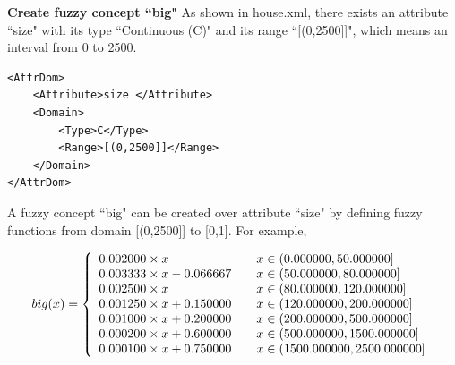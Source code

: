 \begin{ex} \textbf{Create fuzzy concept ``big"}
\label{ex:CreateFuzzyConcept}
As shown in house.xml, there exists an attribute ``size"  with its type ``Continuous (C)" and its range ``[(0,2500]]", which means an interval from 0 to 2500.
\begin{lstlisting}
<AttrDom>
	<Attribute>size </Attribute> 
	<Domain>
		<Type>C</Type>
		<Range>[(0,2500]]</Range> 
	</Domain>
</AttrDom>
\end{lstlisting}

A fuzzy concept ``big" can be created over attribute ``size" by defining fuzzy functions from domain [(0,2500]] to [0,1]. For example, 

\[
  big(x) = \left\{ 
  \begin{array}{l l}
  	0.002000 \times x & \quad x \in (0.000000,50.000000] \\
    	0.003333 \times x-0.066667& \quad x \in (50.000000,80.000000]  \\
    	0.002500 \times x & \quad x \in (80.000000,120.000000] \\
   	0.001250 \times x+0.150000 & \quad x \in (120.000000,200.000000] \\
    	0.001000 \times x+0.200000 & \quad x \in (200.000000,500.000000]  \\
    	0.000200 \times x+0.600000 & \quad x \in (500.000000,1500.000000]  \\
	0.000100 \times x+0.750000 & \quad x \in (1500.000000,2500.000000]  \\
  \end{array} \right.
\]
\end{ex}


